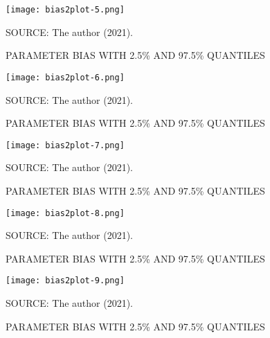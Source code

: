 \begin{figure}[H]
 \setlength{\abovecaptionskip}{.0001pt}
 \caption{PARAMETER BIAS WITH 2.5\% AND 97.5\% QUANTILES}
 \vspace{0.2cm}\centering
 \texttt{[image: bias2plot-5.png]}\\
 \begin{footnotesize}
  SOURCE: The author (2021).
 \end{footnotesize}
 \label{fig:biasw1}
\end{figure}

\begin{figure}[H]
 \setlength{\abovecaptionskip}{.0001pt}
 \caption{PARAMETER BIAS WITH 2.5\% AND 97.5\% QUANTILES}
 \vspace{0.2cm}\centering
 \texttt{[image: bias2plot-6.png]}\\
 \begin{footnotesize}
  SOURCE: The author (2021).
 \end{footnotesize}
 \label{fig:biasw2}
\end{figure}

\begin{figure}[H]
 \setlength{\abovecaptionskip}{.0001pt}
 \caption{PARAMETER BIAS WITH 2.5\% AND 97.5\% QUANTILES}
 \vspace{0.2cm}\centering
 \texttt{[image: bias2plot-7.png]}\\
 \begin{footnotesize}
  SOURCE: The author (2021).
 \end{footnotesize}
 \label{fig:biaslogs2_1}
\end{figure}

\begin{figure}[H]
 \setlength{\abovecaptionskip}{.0001pt}
 \caption{PARAMETER BIAS WITH 2.5\% AND 97.5\% QUANTILES}
 \vspace{0.2cm}\centering
 \texttt{[image: bias2plot-8.png]}\\
 \begin{footnotesize}
  SOURCE: The author (2021).
 \end{footnotesize}
 \label{fig:biaslogs2_2}
\end{figure}

\begin{figure}[H]
 \setlength{\abovecaptionskip}{.0001pt}
 \caption{PARAMETER BIAS WITH 2.5\% AND 97.5\% QUANTILES}
 \vspace{0.2cm}\centering
 \texttt{[image: bias2plot-9.png]}\\
 \begin{footnotesize}
  SOURCE: The author (2021).
 \end{footnotesize}
 \label{fig:biaslogs2_3}
\end{figure}

